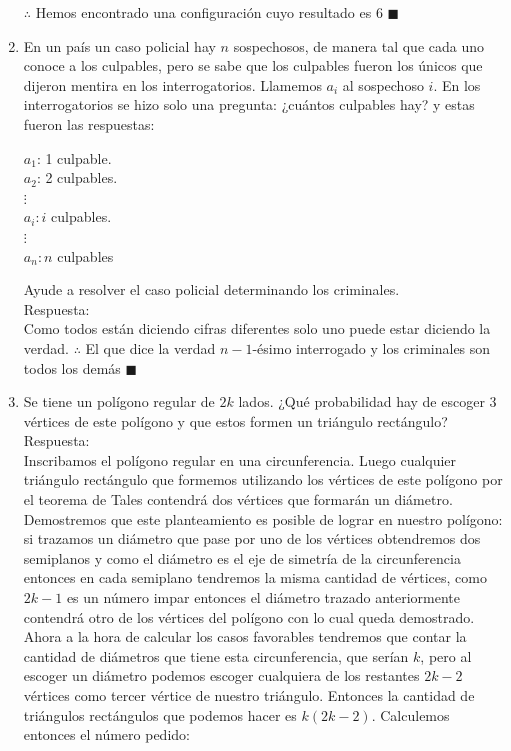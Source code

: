 \documentclass{book}
\begin{document}
\begin{enumerate}
			 $\therefore$ Hemos encontrado una configuración cuyo resultado es 6 $\blacksquare$\\ 
			    \item En un país un caso policial hay $n$ sospechosos, de manera tal que cada uno conoce a los culpables, pero se sabe que los culpables fueron los únicos que dijeron mentira en los interrogatorios. Llamemos $a_i$ al sospechoso $i$. En los interrogatorios  se hizo solo una pregunta: ¿cuántos culpables hay? y estas fueron las respuestas:
					\begin{center}
						$a_1$: 1 culpable.\\
$a_2$: 2 culpables.\\
$\vdots$\\
$a_i: i$ culpables.\\
$\vdots$\\
$a_n: n$ culpables
					\end{center}
					Ayude a resolver el caso policial determinando los criminales.\\
					Respuesta:\\
					Como todos están diciendo cifras diferentes solo uno puede estar diciendo la verdad. $\therefore$ El que dice la verdad $n-1$-ésimo interrogado y los criminales son todos los demás $\blacksquare$\\
				\item Se tiene un polígono regular de $2k$ lados. ¿Qué probabilidad hay de escoger 3 vértices de este polígono y que estos formen un triángulo rectángulo?\\
				Respuesta:\\
				Inscribamos el polígono regular en una circunferencia. Luego cualquier triángulo rectángulo que formemos utilizando los vértices de este polígono por el teorema de Tales contendrá dos vértices que formarán un diámetro. Demostremos que este planteamiento es posible de lograr en nuestro polígono: si trazamos un diámetro que pase por uno de los vértices obtendremos dos semiplanos y como el diámetro es el eje de simetría de la circunferencia entonces en cada semiplano tendremos la misma cantidad de vértices, como $2k-1$ es un número impar entonces el diámetro trazado anteriormente contendrá otro de los vértices del polígono con lo cual queda demostrado. 
				 Ahora a la hora de calcular los casos favorables tendremos que contar la cantidad de diámetros que tiene esta circunferencia, que serían $k$, pero al escoger un diámetro podemos escoger cualquiera de los restantes $2k-2$ vértices como tercer vértice de nuestro triángulo. Entonces la cantidad de triángulos rectángulos que podemos hacer es $k(2k-2)$. Calculemos entonces el número pedido:

\end{enumerate}
\end{document}
